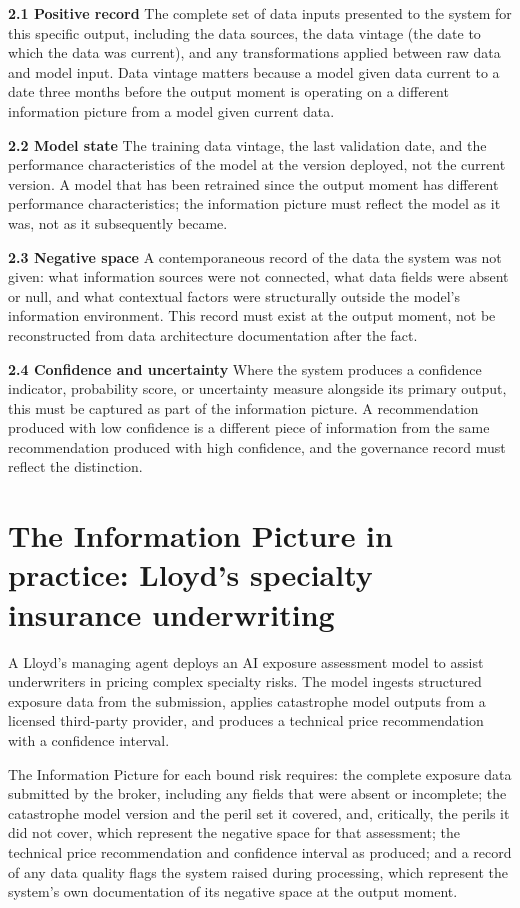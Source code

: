 \textbf{2.1 Positive record} The complete set of data inputs presented to the system for this specific output, including the data sources, the data vintage (the date to which the data was current), and any transformations applied between raw data and model input. Data vintage matters because a model given data current to a date three months before the output moment is operating on a different information picture from a model given current data.

\textbf{2.2 Model state} The training data vintage, the last validation date, and the performance characteristics of the model at the version deployed, not the current version. A model that has been retrained since the output moment has different performance characteristics; the information picture must reflect the model as it was, not as it subsequently became.

\textbf{2.3 Negative space} A contemporaneous record of the data the system was not given: what information sources were not connected, what data fields were absent or null, and what contextual factors were structurally outside the model's information environment. This record must exist at the output moment, not be reconstructed from data architecture documentation after the fact.

\textbf{2.4 Confidence and uncertainty} Where the system produces a confidence indicator, probability score, or uncertainty measure alongside its primary output, this must be captured as part of the information picture. A recommendation produced with low confidence is a different piece of information from the same recommendation produced with high confidence, and the governance record must reflect the distinction.

\section{The Information Picture in practice: Lloyd's specialty insurance underwriting}

A Lloyd's managing agent deploys an AI exposure assessment model to assist underwriters in pricing complex specialty risks. The model ingests structured exposure data from the submission, applies catastrophe model outputs from a licensed third-party provider, and produces a technical price recommendation with a confidence interval.

The Information Picture for each bound risk requires: the complete exposure data submitted by the broker, including any fields that were absent or incomplete; the catastrophe model version and the peril set it covered, and, critically, the perils it did not cover, which represent the negative space for that assessment; the technical price recommendation and confidence interval as produced; and a record of any data quality flags the system raised during processing, which represent the system's own documentation of its negative space at the output moment.

